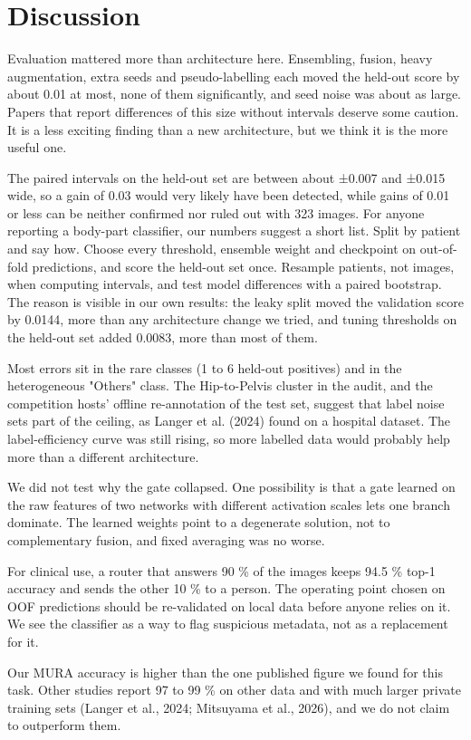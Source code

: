 \section{Discussion}
Evaluation mattered more than architecture here. Ensembling, fusion, heavy augmentation, extra seeds and pseudo-labelling each moved the held-out score by about 0.01 at most, none of them significantly, and seed noise was about as large. Papers that report differences of this size without intervals deserve some caution. It is a less exciting finding than a new architecture, but we think it is the more useful one.

The paired intervals on the held-out set are between about ±0.007 and ±0.015 wide, so a gain of 0.03 would very likely have been detected, while gains of 0.01 or less can be neither confirmed nor ruled out with 323 images. For anyone reporting a body-part classifier, our numbers suggest a short list. Split by patient and say how. Choose every threshold, ensemble weight and checkpoint on out-of-fold predictions, and score the held-out set once. Resample patients, not images, when computing intervals, and test model differences with a paired bootstrap. The reason is visible in our own results: the leaky split moved the validation score by 0.0144, more than any architecture change we tried, and tuning thresholds on the held-out set added 0.0083, more than most of them.

Most errors sit in the rare classes (1 to 6 held-out positives) and in the heterogeneous "Others" class. The Hip-to-Pelvis cluster in the audit, and the competition hosts' offline re-annotation of the test set, suggest that label noise sets part of the ceiling, as Langer et al. (2024) found on a hospital dataset. The label-efficiency curve was still rising, so more labelled data would probably help more than a different architecture.

We did not test why the gate collapsed. One possibility is that a gate learned on the raw features of two networks with different activation scales lets one branch dominate. The learned weights point to a degenerate solution, not to complementary fusion, and fixed averaging was no worse.

For clinical use, a router that answers 90 \% of the images keeps 94.5 \% top-1 accuracy and sends the other 10 \% to a person. The operating point chosen on OOF predictions should be re-validated on local data before anyone relies on it. We see the classifier as a way to flag suspicious metadata, not as a replacement for it.

Our MURA accuracy is higher than the one published figure we found for this task. Other studies report 97 to 99 \% on other data and with much larger private training sets (Langer et al., 2024; Mitsuyama et al., 2026), and we do not claim to outperform them.


